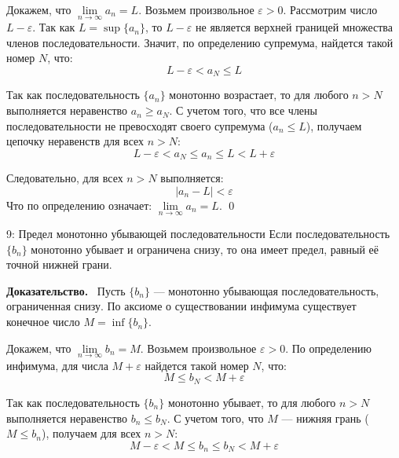 \documentclass[a4paper,12pt]{article}
\newcommand{\myproof}{\textbf{Доказательство.}\ }
\begin{document}
	Докажем, что $\lim\limits_{n \to \infty} a_n = L$.
	Возьмем произвольное $\varepsilon > 0$. Рассмотрим число $L - \varepsilon$.
	Так как $L = \sup \{a_n\}$, то $L - \varepsilon$ не является верхней границей множества членов последовательности. Значит, по определению супремума, найдется такой номер $N$, что:
	\[ L - \varepsilon < a_N \le L \]
	
	Так как последовательность $\{a_n\}$ монотонно возрастает, то для любого $n > N$ выполняется неравенство $a_n \ge a_N$. С учетом того, что все члены последовательности не превосходят своего супремума ($a_n \le L$), получаем цепочку неравенств для всех $n > N$:
	\[ L - \varepsilon < a_N \le a_n \le L < L + \varepsilon \]
	
	Следовательно, для всех $n > N$ выполняется:
	\[ |a_n - L| < \varepsilon \]
	Что по определению означает: $\lim\limits_{n \to \infty} a_n = L$. \qed
	
	\begin{center}
	\end{center}
	
	
	
	
	
	\newpage
	\begin{theorembox}{9: Предел монотонно убывающей последовательности}
		Если последовательность $\{b_n\}$ монотонно убывает и ограничена снизу, то она имеет предел, равный её точной нижней грани.
	\end{theorembox}
	
	\vspace{0.5cm}
	\myproof
	Пусть $\{b_n\}$ — монотонно убывающая последовательность, ограниченная снизу. По аксиоме о существовании инфимума существует конечное число $M = \inf \{b_n\}$. 
	
	Докажем, что $\lim\limits_{n \to \infty} b_n = M$.
	Возьмем произвольное $\varepsilon > 0$. По определению инфимума, для числа $M + \varepsilon$ найдется такой номер $N$, что:
	\[ M \le b_N < M + \varepsilon \]
	
	Так как последовательность $\{b_n\}$ монотонно убывает, то для любого $n > N$ выполняется неравенство $b_n \le b_N$. С учетом того, что $M$ — нижняя грань ($M \le b_n$), получаем для всех $n > N$:
	\[ M - \varepsilon < M \le b_n \le b_N < M + \varepsilon \]
	
\end{document}
